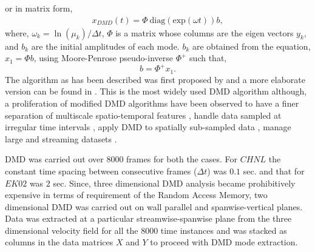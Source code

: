\documentclass{article}
\begin{document}
or in matrix form, 
\begin{align}
x_{DMD}(t)= \Phi\  \text{diag}(\text{exp}(\omega t)) b,
\end{align}
where, $\omega_k = \ln (\mu_{k})/ \Delta t$, $\Phi$ is a matrix whose columns are the eigen vectors $y_{k} $, and $b_{k}$ are the initial amplitudes of each mode. $b_{k}$ are obtained from the equation, $x_1=\Phi b$, using Moore-Penrose pseudo-inverse $\Phi^{+}$ such that,
\begin{equation}
 b = \Phi^{+}x_{1} .
\end{equation}
The algorithm as has been described was first proposed by \citet{schmid_jfm2010} and a more elaborate version can be found in \citep{kutz_book2013, rowley_mezic_schlatter_jfm_2009,tu_thesis}. This is the most widely used DMD algorithm although, a proliferation of modified DMD algorithms have been observed to have a finer separation of multiscale spatio-temporal features \citep[eg. ][]{kutz_fu_brunton_siam_2016}, handle data sampled at irregular time intervals \citep[][]{tu_thesis}, apply DMD to spatially sub-sampled data \citep{florimond_mathelin_pof_2015}, manage large and streaming datasets \citep{hemati_pof_2014}.

DMD was carried out over 8000 frames for both the cases. For $CHNL$ the constant time spacing between consecutive frames ($\Delta t$) was $0.1$ sec. and that for $EK02$ was $2$ sec. Since, three dimensional DMD analysis became prohibitively expensive in terms of requirement of the Random Access Memory, two dimensional DMD was carried out on wall parallel and spanwise-vertical planes. Data was extracted at a particular streamwise-spanwise plane from the three dimensional velocity field for all the 8000 time instances and was stacked as columns in the data matrices $X$ and $Y$ to proceed with DMD mode extraction.   
\end{document}
